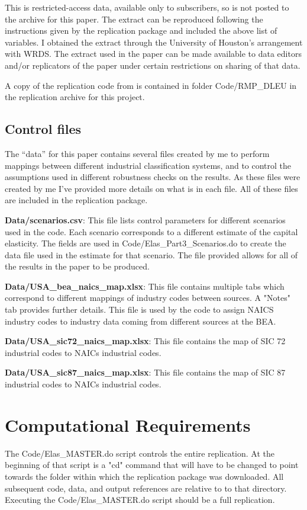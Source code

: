 \documentclass[11pt]{article}
\begin{document}
This is restricted-access data, available only to subscribers, so is not posted to the archive for this paper. The extract can be reproduced following the instructions given by the \cite{dleu2020} replication package and included the above list of variables. I obtained the extract through the University of Houston's arrangement with WRDS. The extract used in the paper can be made available to data editors and/or replicators of the paper under certain restrictions on sharing of that data. 

A copy of the replication code from \cite{dleu2020} is contained in folder Code/RMP\_DLEU in the replication archive for this project.

\subsection{Control files}
The ``data'' for this paper contains several files created by me to perform mappings between different industrial classification systems, and to control the assumptions used in different robustness checks on the results. As these files were created by me I've provided more details on what is in each file. All of these files are included in the replication package.

\textbf{Data/scenarios.csv}: This file lists control parameters for different scenarios used in the code. Each scenario corresponds to a different estimate of the capital elasticity. The fields are used in Code/Elas\_Part3\_Scenarios.do to create the data file used in the estimate for that scenario. The file provided allows for all of the results in the paper to be produced. 

\textbf{Data/USA\_bea\_naics\_map.xlsx}: This file contains multiple tabs which correspond to different mappings of industry codes between sources. A "Notes" tab provides further details. This file is used by the code to assign NAICS industry codes to industry data coming from different sources at the BEA.

\textbf{Data/USA\_sic72\_naics\_map.xlsx}: This file contains the map of SIC 72 industrial codes to NAICs industrial codes. 

\textbf{Data/USA\_sic87\_naics\_map.xlsx}: This file contains the map of SIC 87 industrial codes to NAICs industrial codes. 

\section{Computational Requirements}
The Code/Elas\_MASTER.do script controls the entire replication. At the beginning of that script is a "cd" command that will have to be changed to point towards the folder within which the replication package was downloaded. All subsequent code, data, and output references are relative to to that directory. Executing the Code/Elas\_MASTER.do script should be a full replication.
\end{document}
